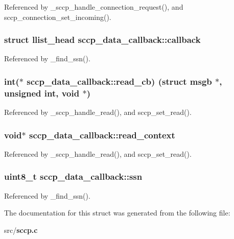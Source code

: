 Referenced by \+\_\+sccp\+\_\+handle\+\_\+connection\+\_\+request(), and sccp\+\_\+connection\+\_\+set\+\_\+incoming().

\subsubsection[{callback}]{\setlength{\rightskip}{0pt plus 5cm}struct llist\+\_\+head sccp\+\_\+data\+\_\+callback\+::callback}\label{structsccp__data__callback_a70811e93d7109436d8a521a36912b1ff}


Referenced by \+\_\+find\+\_\+ssn().

\subsubsection[{read\+\_\+cb}]{\setlength{\rightskip}{0pt plus 5cm}int($\ast$ sccp\+\_\+data\+\_\+callback\+::read\+\_\+cb) (struct msgb $\ast$, unsigned int, void $\ast$)}\label{structsccp__data__callback_a1c9df9c12e6ae9015aa5a94ec91af3c8}


Referenced by \+\_\+sccp\+\_\+handle\+\_\+read(), and sccp\+\_\+set\+\_\+read().

\subsubsection[{read\+\_\+context}]{\setlength{\rightskip}{0pt plus 5cm}void$\ast$ sccp\+\_\+data\+\_\+callback\+::read\+\_\+context}\label{structsccp__data__callback_ab5b0d2e210c8379566ebd6c9605d80d7}


Referenced by \+\_\+sccp\+\_\+handle\+\_\+read(), and sccp\+\_\+set\+\_\+read().

\subsubsection[{ssn}]{\setlength{\rightskip}{0pt plus 5cm}uint8\+\_\+t sccp\+\_\+data\+\_\+callback\+::ssn}\label{structsccp__data__callback_a0e8dc2904ffe3b886c682a8a1bd2374a}


Referenced by \+\_\+find\+\_\+ssn().



The documentation for this struct was generated from the following file\+:\begin{DoxyCompactItemize}
\item 
src/{\bf sccp.\+c}\end{DoxyCompactItemize}
